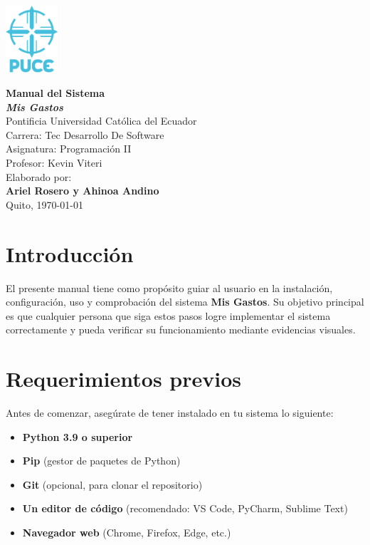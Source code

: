 \documentclass[12pt,a4paper]{article}
\begin{document}
\begin{titlepage}
\begin{flushright}   
 \vspace*{-2cm}
 \includegraphics[height=2.5cm]{logo puce.png} 
\end{flushright}
 \centering
 \vspace*{1cm}
 {\Huge\bfseries Manual del Sistema\\[1.5ex] \textit{Mis Gastos}}\\[2cm]
 {\Large Pontificia Universidad Católica del Ecuador}\\[1cm]
 {\large Carrera: Tec Desarrollo De Software}\\[0.5cm]
 {\large Asignatura: Programación II}\\[0.5cm]
 {\large Profesor: Kevin Viteri}\\[1cm]
 {\large Elaborado por:}\\[0.3cm]
 {\bfseries Ariel Rosero y Ahinoa Andino}\\[2cm]
 {\large Quito, \today}
 \vfill
\end{titlepage}

\tableofcontents
\newpage

\section{Introducción}
El presente manual tiene como propósito guiar al usuario en la instalación, configuración, uso y comprobación del sistema \textbf{Mis Gastos}. Su objetivo principal es que cualquier persona que siga estos pasos logre implementar el sistema correctamente y pueda verificar su funcionamiento mediante evidencias visuales.

\section{Requerimientos previos}
Antes de comenzar, asegúrate de tener instalado en tu sistema lo siguiente:

\begin{itemize}
    \item \textbf{Python 3.9 o superior}
    \item \textbf{Pip} (gestor de paquetes de Python)
    \item \textbf{Git} (opcional, para clonar el repositorio)
    \item \textbf{Un editor de código} (recomendado: VS Code, PyCharm, Sublime Text)
    \item \textbf{Navegador web} (Chrome, Firefox, Edge, etc.)
\end{itemize}
\end{document}
